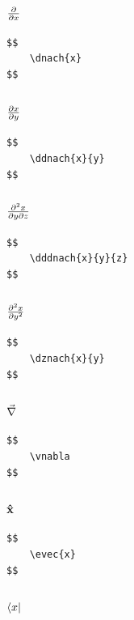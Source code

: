 \documentclass[a4paper]{article}
\begin{document}
\subsubsection{$ \frac{\partial}{\partial x}$}

\begin{verbatim}
$$
	\dnach{x}
$$
\end{verbatim}

\subsubsection{$ \frac{\partial x}{\partial y}$}

\begin{verbatim}
$$
	\ddnach{x}{y}
$$
\end{verbatim}


\subsubsection{$ \frac{\partial^2 x}{\partial y \partial z}$}

\begin{verbatim}
$$
	\dddnach{x}{y}{z}
$$
\end{verbatim}

\subsubsection{$ \frac{\partial^2 x}{\partial y^2}$}

\begin{verbatim}
$$
	\dznach{x}{y}
$$
\end{verbatim}

\subsubsection{$ \vec{\nabla}$}

\begin{verbatim}
$$
	\vnabla
$$
\end{verbatim}

\subsubsection{$ \mathbf{\hat{x}}$}

\begin{verbatim}
$$
	\evec{x}
$$
\end{verbatim}

\subsubsection{$ \langle x|$}
\end{document}
